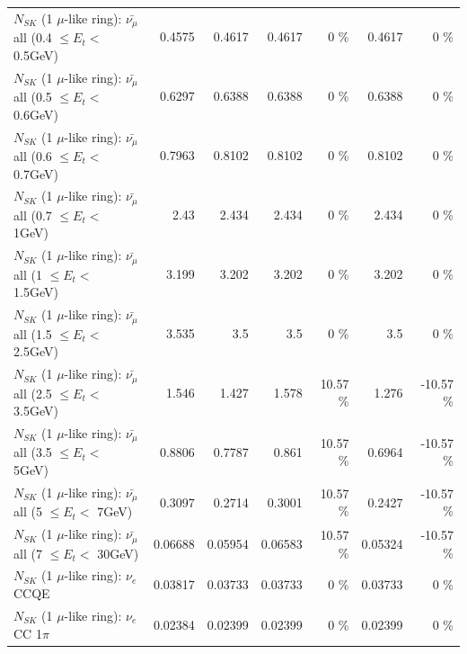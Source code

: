 \begin{table}
\begin{tabular}{| l | r | r | r  r | r  r |}
 $N_{SK}$ (1 $\mu$-like ring): $\bar{\nu_{\mu}}$ all (0.4 $\leq E_{t} <$ 0.5GeV) &          0.4575 &          0.4617 &          0.4617 &        0 \%  &          0.4617 &        0 \%  \\ 
 $N_{SK}$ (1 $\mu$-like ring): $\bar{\nu_{\mu}}$ all (0.5 $\leq E_{t} <$ 0.6GeV) &          0.6297 &          0.6388 &          0.6388 &        0 \%  &          0.6388 &        0 \%  \\ 
 $N_{SK}$ (1 $\mu$-like ring): $\bar{\nu_{\mu}}$ all (0.6 $\leq E_{t} <$ 0.7GeV) &          0.7963 &          0.8102 &          0.8102 &        0 \%  &          0.8102 &        0 \%  \\ 
   $N_{SK}$ (1 $\mu$-like ring): $\bar{\nu_{\mu}}$ all (0.7 $\leq E_{t} <$ 1GeV) &            2.43 &           2.434 &           2.434 &        0 \%  &           2.434 &        0 \%  \\ 
   $N_{SK}$ (1 $\mu$-like ring): $\bar{\nu_{\mu}}$ all (1 $\leq E_{t} <$ 1.5GeV) &           3.199 &           3.202 &           3.202 &        0 \%  &           3.202 &        0 \%  \\ 
 $N_{SK}$ (1 $\mu$-like ring): $\bar{\nu_{\mu}}$ all (1.5 $\leq E_{t} <$ 2.5GeV) &           3.535 &             3.5 &             3.5 &        0 \%  &             3.5 &        0 \%  \\ 
 $N_{SK}$ (1 $\mu$-like ring): $\bar{\nu_{\mu}}$ all (2.5 $\leq E_{t} <$ 3.5GeV) &           1.546 &           1.427 &           1.578 &    10.57 \%  &           1.276 &   -10.57 \%  \\ 
   $N_{SK}$ (1 $\mu$-like ring): $\bar{\nu_{\mu}}$ all (3.5 $\leq E_{t} <$ 5GeV) &          0.8806 &          0.7787 &           0.861 &    10.57 \%  &          0.6964 &   -10.57 \%  \\ 
     $N_{SK}$ (1 $\mu$-like ring): $\bar{\nu_{\mu}}$ all (5 $\leq E_{t} <$ 7GeV) &          0.3097 &          0.2714 &          0.3001 &    10.57 \%  &          0.2427 &   -10.57 \%  \\ 
    $N_{SK}$ (1 $\mu$-like ring): $\bar{\nu_{\mu}}$ all (7 $\leq E_{t} <$ 30GeV) &         0.06688 &         0.05954 &         0.06583 &    10.57 \%  &         0.05324 &   -10.57 \%  \\ 
\hline
\hline
\hline
                                      $N_{SK}$ (1 $\mu$-like ring): $\nu_e$ CCQE &         0.03817 &         0.03733 &         0.03733 &        0 \%  &         0.03733 &        0 \%  \\ 
                                 $N_{SK}$ (1 $\mu$-like ring): $\nu_e$ CC 1$\pi$ &         0.02384 &         0.02399 &         0.02399 &        0 \%  &         0.02399 &        0 \%  \\ 

\end{tabular}
\end{table}
